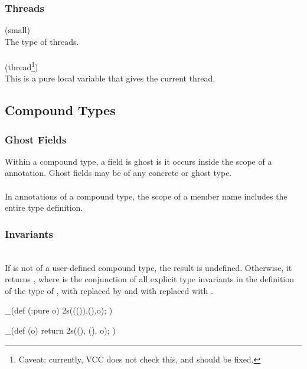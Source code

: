 \documentclass[preprint,nocopyrightspace]{sigplanconf}
\begin{document}
{{{\subsubsection{Threads}
\vcc{\thread} (small) \\
The type of threads. 
\\\\
 (thread\footnote{Caveat: currently, VCC does
not check this, and should be fixed.})\\
This is a pure local variable that gives the current
thread. 

\subsection{Compound Types}
 
\subsubsection{Ghost Fields}
Within a compound type, a field is ghost is it occurs inside the scope
of a   annotation. Ghost fields may be of any concrete
or ghost type. 
\\\\
In annotations of a compound type, the scope of a member name includes
the entire type definition.

\subsubsection{Invariants}

\\
If  is not of a user-defined compound type, the result is 
undefined. Otherwise, it returns , where 
is the conjunction of all explicit 
type invariants in the definition of the type of ,
with  replaced by  and
with \vcc{\this} replaced with .

\begin{VCC}
_(def \bool {}(:pure \object o)
{ \return \inv2s(\old(\now()),\now(),o); })
\end{VCC}

\begin{VCC}
_(def \bool \inv(\object o)
{ return \inv2s(\now(), \now(), o); })
\end{VCC}

}}}
\end{document}
